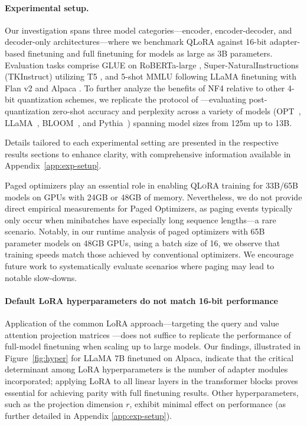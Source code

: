 \paragraph{Experimental setup.} Our investigation spans three model categories—encoder, encoder-decoder, and decoder-only architectures—where we benchmark QLoRA against 16-bit adapter-based finetuning and full finetuning for models as large as 3B parameters. Evaluation tasks comprise GLUE \citep{wang2018glue} on RoBERTa-large \citep{liu2019roberta}, Super-NaturalInstructions (TKInstruct) \citep{wang2022super} utilizing T5 \citep{t5}, and 5-shot MMLU \citep{hendrycksmeasuring} following LLaMA finetuning with Flan v2 \citep{longpre2023flan} and Alpaca \citep{alpaca}. To further analyze the benefits of NF4 relative to other 4-bit quantization schemes, we replicate the protocol of \citet{dettmers2022case}—evaluating post-quantization zero-shot accuracy and perplexity across a variety of models (OPT~\citep{zhang2022opt}, LLaMA~\citep{touvron2023llama}, BLOOM~\citep{scao2022bloom}, and Pythia~\citep{biderman2023pythia}) spanning model sizes from 125m up to 13B.

Details tailored to each experimental setting are presented in the respective results sections to enhance clarity, with comprehensive information available in Appendix~\ref{app:exp-setup}.

Paged optimizers play an essential role in enabling \textsc{QLoRA} training for 33B/65B models on GPUs with 24GB or 48GB of memory. Nevertheless, we do not provide direct empirical measurements for Paged Optimizers, as paging events typically only occur when minibatches have especially long sequence lengths—a rare scenario. Notably, in our runtime analysis of paged optimizers with 65B parameter models on 48GB GPUs, using a batch size of 16, we observe that training speeds match those achieved by conventional optimizers. We encourage future work to systematically evaluate scenarios where paging may lead to notable slow-downs.

\paragraph{Default LoRA hyperparameters do not match 16-bit performance} 

Application of the common LoRA approach—targeting the query and value attention projection matrices \citep{hu2021lora}—does not suffice to replicate the performance of full-model finetuning when scaling up to large models. Our findings, illustrated in Figure~\ref{fig:hyper} for LLaMA 7B finetuned on Alpaca, indicate that the critical determinant among LoRA hyperparameters is the number of adapter modules incorporated; applying LoRA to all linear layers in the transformer blocks proves essential for achieving parity with full finetuning results. Other hyperparameters, such as the projection dimension $r$, exhibit minimal effect on performance (as further detailed in Appendix \ref{app:exp-setup}).

